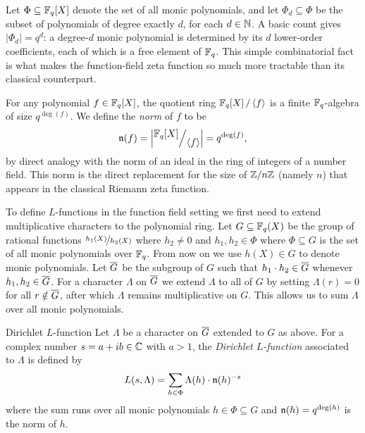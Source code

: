 Let $\Phi\subseteq\mathbb{F}_q[X]$ denote the set of all monic polynomials, and let $\Phi_d\subseteq\Phi$ be the subset of polynomials of degree exactly $d$, for each $d\in\mathbb{N}$. A basic count gives $|\Phi_d|=q^d$: a degree-$d$ monic polynomial is determined by its $d$ lower-order coefficients, each of which is a free element of $\mathbb{F}_q$. This simple combinatorial fact is what makes the function-field zeta function so much more tractable than its classical counterpart.

For any polynomial $f\in\mathbb{F}_q[X]$, the quotient ring $\quotient{\bbF_q[X]}{\la f\ra}$ is a finite $\mathbb{F}_q$-algebra of size $q^{\deg(f)}$. We define the \emph{norm} of $f$ to be
$$\mfn(f)=\lt|\quotient{\bbF_q[X]}{\la f\ra}\rt|=q^{\deg(f)},$$
by direct analogy with the norm of an ideal in the ring of integers of a number field. This norm is the direct replacement for the size of $\mathbb{Z}/n\mathbb{Z}$ (namely $n$) that appears in the classical Riemann zeta function.

To define $L$-functions in the function field setting we first need to extend multiplicative characters to the polynomial ring. Let $G\subseteq\mathbb{F}_q(X)$ be the group of rational functions $\nicefrac{h_1(X)}{h_2(X)}$ where $h_2\neq 0$ and $h_1,h_2\in\Phi$ where $\Phi\subseteq G$ is the set of all monic polynomials over $\mathbb{F}_q$. From now on we use $h(X)\in G$ to denote monic polynomials. Let $\overline{G}$ be the subgroup of $G$ such that $h_1\cdot h_2\in \overline{G}$ whenever $h_1,h_2\in\overline{G}$. For a character $\Lambda$ on $\overline{G}$ we extend $\Lambda$ to all of $G$ by setting $\Lambda(r)=0$ for all $r\notin \overline{G}$, after which $\Lambda$ remains multiplicative on $G$. This allows us to sum $\Lambda$ over all monic polynomials.
\begin{Definition}{Dirichlet $L$-function}{}
  Let $\Lambda$ be a character on $\overline{G}$ extended to $G$ as above. For a complex number $s=a+ib\in\mathbb{C}$ with $a>1$, the \emph{Dirichlet $L$-function} associated to $\Lambda$ is defined by $$L(s,\Lambda)=\sum_{h\in\Phi}\Lambda(h)\cdot \mathfrak{n}(h)^{-s}$$where the sum runs over all monic polynomials $h\in\Phi\subseteq G$ and $\mathfrak{n}(h)=q^{\deg(h)}$ is the norm of $h$.
\end{Definition}

